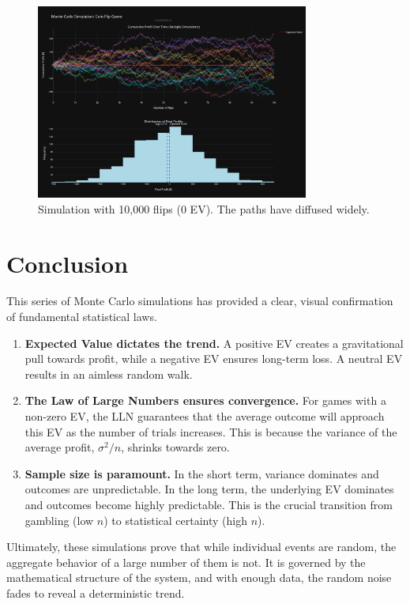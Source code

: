 \documentclass[12pt]{article}
\begin{document}
\begin{figure}[h!]
\centering
\includegraphics[width=0.8\textwidth]{nev/10knev.png}
\caption{Simulation with 10,000 flips (0 EV). The paths have diffused widely.}
\end{figure}

\section{Conclusion}
This series of Monte Carlo simulations has provided a clear, visual confirmation of fundamental statistical laws.

\begin{enumerate}
    \item \textbf{Expected Value dictates the trend.} A positive EV creates a gravitational pull towards profit, while a negative EV ensures long-term loss. A neutral EV results in an aimless random walk.
    \item \textbf{The Law of Large Numbers ensures convergence.} For games with a non-zero EV, the LLN guarantees that the average outcome will approach this EV as the number of trials increases. This is because the variance of the average profit, $\sigma^2/n$, shrinks towards zero.
    \item \textbf{Sample size is paramount.} In the short term, variance dominates and outcomes are unpredictable. In the long term, the underlying EV dominates and outcomes become highly predictable. This is the crucial transition from gambling (low $n$) to statistical certainty (high $n$).
\end{enumerate}

Ultimately, these simulations prove that while individual events are random, the aggregate behavior of a large number of them is not. It is governed by the mathematical structure of the system, and with enough data, the random noise fades to reveal a deterministic trend.
\end{document}
